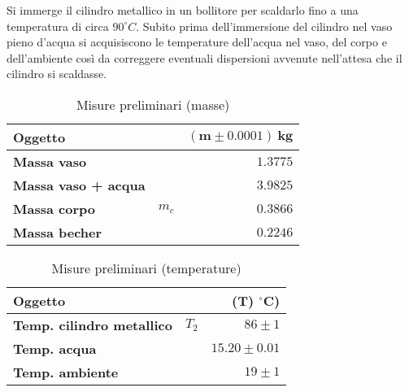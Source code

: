 \documentclass{article}
\begin{document}
	Si immerge il cilindro metallico in un bollitore per scaldarlo fino a una temperatura di circa \(90 ^\circ C\). Subito prima dell'immersione del cilindro nel vaso pieno d'acqua si acquisiscono le temperature dell'acqua nel vaso, del corpo e dell'ambiente così da correggere eventuali dispersioni avvenute nell'attesa che il cilindro si scaldasse.
	
	\vspace{1cm}
	\begin{minipage}{0.4\textwidth}
		\begin{table}[H] \centering
			\begin{small}
				\begin{tabular}{@{}lrr@{}}\toprule
					\textbf{Oggetto}& &  \(\boldsymbol{(m \pm 0.0001) \SI{}{\kilogram}}\) \\ \midrule
					\textbf{Massa vaso}	&	 & \(1.3775\)   \\  \hdashline
					\textbf{Massa vaso + acqua}	&	 & \(3.9825\)   \\  \hdashline
					\textbf{Massa corpo}	& \(m_{c}\)	 & \(0.3866\)   \\  \hdashline
					\textbf{Massa becher}	&	 & \(0.2246\)   \\
					\bottomrule
				\end{tabular}
			\end{small}
			\caption{Misure preliminari (masse)}
		\end{table}
	\end{minipage}
	\begin{minipage}{0.6\textwidth}
		\begin{table}[H] \centering
			\begin{small}
				\begin{tabular}{@{}lrr@{}}\toprule
					\textbf{Oggetto}					&  			& \textbf{(\(\boldsymbol{T}\))} \(\boldsymbol{^\circ C}\))\\ \midrule
					\textbf{Temp. cilindro metallico}	& 	\(T_{2}\)		& \(86 \pm 1\)	 \\  \hdashline
					\textbf{Temp. acqua}				&					&\(15.20 \pm 0.01\)		 	 \\  \hdashline
					\textbf{Temp. ambiente}				&					& \(19 \pm 1\)		 	  \\  
					\bottomrule
				\end{tabular}
			\end{small}
			\caption{Misure preliminari (temperature)}
		\end{table}
	\end{minipage}
	\vspace{1cm}
	
\end{document}

